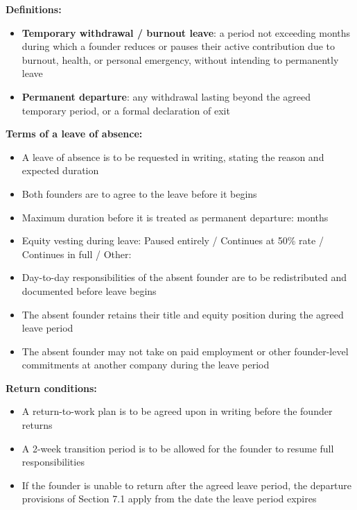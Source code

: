 \documentclass[12pt,a4paper]{article}
\newcommand{\blank}[1][5.5cm]{\underline{\hspace{#1}}}
\begin{document}
\noindent\textbf{Definitions:}

\begin{itemize}
  \item \textbf{Temporary withdrawal / burnout leave}: a period not exceeding \blank[1.5cm] months during which a founder reduces or pauses their active contribution due to burnout, health, or personal emergency, without intending to permanently leave
  \item \textbf{Permanent departure}: any withdrawal lasting beyond the agreed temporary period, or a formal declaration of exit
\end{itemize}

\noindent\textbf{Terms of a leave of absence:}

\begin{itemize}
  \item A leave of absence is to be requested in writing, stating the reason and expected duration
  \item Both founders are to agree to the leave before it begins
  \item Maximum duration before it is treated as permanent departure: \blank[2cm] months
  \item Equity vesting during leave: \quad Paused entirely \;/\; Continues at 50\% rate \;/\; Continues in full \;/\; Other: \blank[3cm]
  \item Day-to-day responsibilities of the absent founder are to be redistributed and documented before leave begins
  \item The absent founder retains their title and equity position during the agreed leave period
  \item The absent founder may not take on paid employment or other founder-level commitments at another company during the leave period
\end{itemize}

\noindent\textbf{Return conditions:}

\begin{itemize}
  \item A return-to-work plan is to be agreed upon in writing before the founder returns
  \item A 2-week transition period is to be allowed for the founder to resume full responsibilities
  \item If the founder is unable to return after the agreed leave period, the departure provisions of Section 7.1 apply from the date the leave period expires
\end{itemize}
\end{document}
